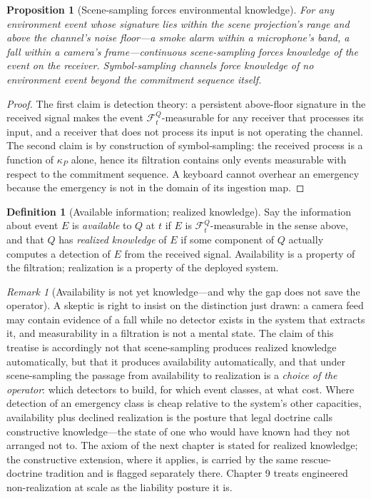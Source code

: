 \documentclass[11pt,oneside]{book}
\theoremstyle{plain}
\newtheorem{proposition}[theorem]{Proposition}
\theoremstyle{definition}
\newtheorem{definition}[theorem]{Definition}
\theoremstyle{remark}
\newtheorem{remark}[theorem]{Remark}
\newcommand{\commit}{\kappa}
\begin{document}
\begin{proposition}[Scene-sampling forces environmental knowledge]
For any environment event whose signature lies within the scene projection's range and above the channel's noise floor---a smoke alarm within a microphone's band, a fall within a camera's frame---continuous scene-sampling forces knowledge of the event on the receiver. Symbol-sampling channels force knowledge of no environment event beyond the commitment sequence itself.
\end{proposition}

\begin{proof}
The first claim is detection theory: a persistent above-floor signature in the received signal makes the event $\mathcal{F}^Q_t$-measurable for any receiver that processes its input, and a receiver that does not process its input is not operating the channel. The second claim is by construction of symbol-sampling: the received process is a function of $\commit_P$ alone, hence its filtration contains only events measurable with respect to the commitment sequence. A keyboard cannot overhear an emergency because the emergency is not in the domain of its ingestion map.
\end{proof}

\begin{definition}[Available information; realized knowledge]
Say the information about event $E$ is \emph{available} to $Q$ at $t$ if $E$ is $\mathcal{F}^Q_t$-measurable in the sense above, and that $Q$ has \emph{realized knowledge} of $E$ if some component of $Q$ actually computes a detection of $E$ from the received signal. Availability is a property of the filtration; realization is a property of the deployed system.
\end{definition}

\begin{remark}[Availability is not yet knowledge---and why the gap does not save the operator]
A skeptic is right to insist on the distinction just drawn: a camera feed may contain evidence of a fall while no detector exists in the system that extracts it, and measurability in a filtration is not a mental state. The claim of this treatise is accordingly not that scene-sampling produces realized knowledge automatically, but that it produces availability automatically, and that under scene-sampling the passage from availability to realization is a \emph{choice of the operator}: which detectors to build, for which event classes, at what cost. Where detection of an emergency class is cheap relative to the system's other capacities, availability plus declined realization is the posture that legal doctrine calls constructive knowledge---the state of one who would have known had they not arranged not to. The axiom of the next chapter is stated for realized knowledge; the constructive extension, where it applies, is carried by the same rescue-doctrine tradition and is flagged separately there. Chapter 9 treats engineered non-realization at scale as the liability posture it is.
\end{remark}
\end{document}
